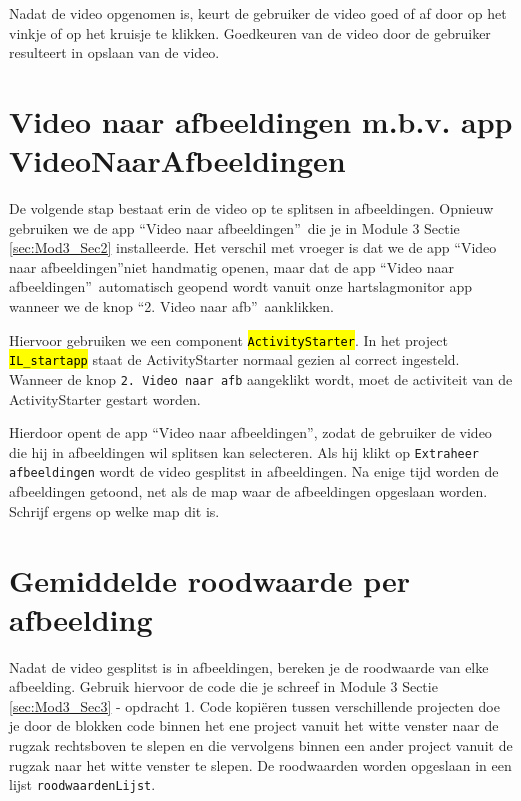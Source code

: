Nadat de video opgenomen is, keurt de gebruiker de video goed of af door op het vinkje of op het kruisje te klikken. Goedkeuren van de video door de gebruiker resulteert in opslaan van de video.

\section{Video naar afbeeldingen m.b.v. app VideoNaarAfbeeldingen}
\label{sec:Mod5_Sec2}
%
De volgende stap bestaat erin de video op te splitsen in afbeeldingen. Opnieuw gebruiken we de app \textquotedblleft Video naar afbeeldingen\textquotedblright \ die je in Module 3 Sectie \ref{sec:Mod3_Sec2} installeerde. Het verschil met vroeger is dat we de app \textquotedblleft Video naar afbeeldingen\textquotedblright niet handmatig openen, maar dat de app \textquotedblleft Video naar afbeeldingen\textquotedblright \ automatisch geopend wordt vanuit onze hartslagmonitor app wanneer we de knop \textquotedblleft 2. Video naar afb\textquotedblright \ aanklikken.

Hiervoor gebruiken we een component \hl{\texttt{ActivityStarter}}. In het project  \hl{\texttt{IL\_startapp}} staat de ActivityStarter normaal gezien al correct ingesteld. Wanneer de knop \texttt{2. Video naar afb} aangeklikt wordt, moet de activiteit van de ActivityStarter gestart worden. 

Hierdoor opent de app \textquotedblleft Video naar afbeeldingen\textquotedblright, zodat de gebruiker de video die hij in afbeeldingen wil splitsen kan selecteren. Als hij klikt op \texttt{Extraheer afbeeldingen} wordt de video gesplitst in afbeeldingen. Na enige tijd worden de afbeeldingen getoond, net als de map waar de afbeeldingen opgeslaan worden. Schrijf ergens op welke map dit is.

\section{Gemiddelde roodwaarde per afbeelding}
\label{sec:Mod5_Sec3}
%
Nadat de video gesplitst is in afbeeldingen, bereken je de roodwaarde van elke afbeelding. Gebruik hiervoor de code die je schreef in Module 3 Sectie \ref{sec:Mod3_Sec3} - opdracht 1. Code kopi\"eren tussen verschillende projecten doe je door de blokken code binnen het ene project vanuit het witte venster naar de rugzak rechtsboven te slepen en die vervolgens binnen een ander project vanuit de rugzak naar het witte venster te slepen. De roodwaarden worden opgeslaan in een lijst \texttt{roodwaardenLijst}. 


